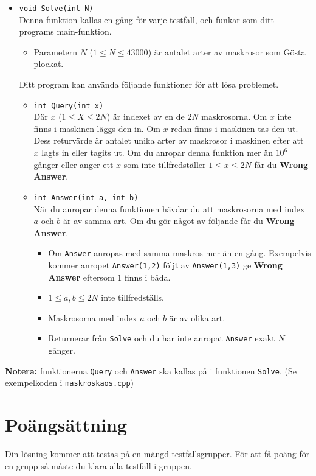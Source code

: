 \begin{itemize}
  \item \texttt{void Solve(int N)}\\
  Denna funktion kallas en gång för varje testfall, och funkar som ditt programs main-funktion.
  \begin{itemize}
    \item Parametern $N$ ($1 \leq N \leq 43000$) är antalet arter av maskrosor som Gösta plockat.
  \end{itemize}
  Ditt program kan använda följande funktioner för att lösa problemet.
  \begin{itemize}
    \item \texttt{int Query(int x)}\\
    Där $x$ ($1 \leq X \leq 2N$) är indexet av en de $2N$ maskrosorna. Om $x$ inte finns i maskinen läggs den in. Om $x$ redan finns
    i maskinen tas den ut. Dess returvärde är antalet unika arter av maskrosor i maskinen efter att $x$ lagts in eller tagits ut.
    Om du anropar denna funktion mer än $10^6$ gånger eller anger ett $x$ som inte tillfredställer $1 \leq x \leq 2N$
    får du \textbf{Wrong Answer}.
    \item \texttt{int Answer(int a, int b)}\\
    När du anropar denna funktionen hävdar du att maskrosorna med index $a$ och $b$ är av samma art. Om du gör något av följande
    får du \textbf{Wrong Answer}.
    \begin{itemize}
      \item Om \texttt{Answer} anropas med samma maskros mer än en gång. Exempelvis kommer anropet \texttt{Answer(1,2)} följt av
      \texttt{Answer(1,3)} ge \textbf{Wrong Answer} eftersom $1$ finns i båda.
      \item $1 \leq a,b \leq 2N$ inte tillfredställs.
      \item Maskrosorna med index $a$ och $b$ är av olika art.
      \item Returnerar från \texttt{Solve} och du har inte anropat \texttt{Answer} exakt $N$ gånger. 
    \end{itemize}
  \end{itemize}
\end{itemize}

\textbf{Notera:} funktionerna \texttt{Query} och \texttt{Answer} ska kallas på i funktionen \texttt{Solve}. (Se exempelkoden i \texttt{maskroskaos.cpp})

\section*{Poängsättning}
Din lösning kommer att testas på en mängd testfallsgrupper.
För att få poäng för en grupp så måste du klara alla testfall i gruppen.

